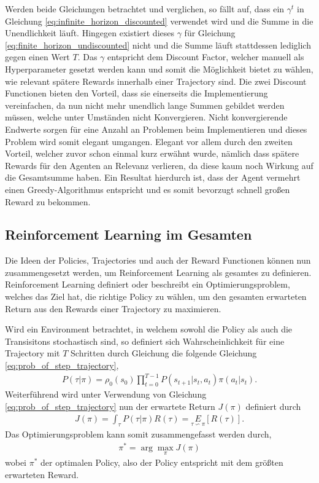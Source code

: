 \documentclass[]{iat}
\begin{document}
Werden beide Gleichungen betrachtet und verglichen, so fällt auf, dass ein $\gamma^t$ in Gleichung \ref{eq:infinite_horizon_discounted} verwendet wird und die Summe in die Unendlichkeit läuft. Hingegen existiert dieses $\gamma$ für Gleichung \ref{eq:finite_horizon_undiscounted} nicht und die Summe läuft stattdessen lediglich gegen einen Wert $T$. Das $\gamma$ entspricht dem Discount Factor, welcher manuell als Hyperparameter gesetzt werden kann und somit die Möglichkeit bietet zu wählen, wie relevant spätere Rewards innerhalb einer Trajectory sind. Die zwei Discount Functionen bieten den Vorteil, dass sie einerseits die Implementierung vereinfachen, da nun nicht mehr unendlich lange Summen gebildet werden müssen, welche unter Umständen nicht Konvergieren. Nicht konvergierende Endwerte sorgen für eine Anzahl an Problemen beim Implementieren und dieses Problem wird somit elegant umgangen. Elegant vor allem durch den zweiten Vorteil, welcher zuvor schon einmal kurz erwähnt wurde, nämlich dass spätere Rewards für den Agenten an Relevanz verlieren, da diese kaum noch Wirkung auf die Gesamtsumme haben. Ein Resultat hierdurch ist, dass der Agent vermehrt einen Greedy-Algorithmus entspricht und es somit bevorzugt schnell großen Reward zu bekommen. \cite[]{SpinningUp2018} \cite[]{Sutton1998}

\subsection{Reinforcement Learning im Gesamten}
Die Ideen der Policies, Trajectories und auch der Reward Functionen können nun zusammengesetzt werden, um Reinforcement Learning als gesamtes zu definieren. Reinforcement Learning definiert oder beschreibt ein Optimierungsproblem, welches das Ziel hat, die richtige Policy zu wählen, um den gesamten erwarteten Return aus den Rewards einer Trajectory zu maximieren.

Wird ein Environment betrachtet, in welchem sowohl die Policy als auch die Transisitons stochastisch sind, so definiert sich Wahrscheinlichkeit für eine Trajectory mit $T$ Schritten durch Gleichung die folgende Gleichung \ref{eq:prob_of_step_trajectory},
\begin{align}
    P(\tau | \pi) = \rho_0(s_0) \prod _{t = 0}^{T-1} P\left(s_{t+1}|s_t,a_t\right)\pi(a_t|s_t). \label{eq:prob_of_step_trajectory}
\end{align}
Weiterführend wird unter Verwendung von Gleichung \ref{eq:prob_of_step_trajectory} nun der erwartete Return $J(\pi)$ definiert durch
\begin{align}
    J(\pi) = \int_{\tau}^{} P(\tau | \pi) R(\tau) = \underset{\tau \backsim \pi}{E}\left[R(\tau)\right]. \label{eq:expected_return}
\end{align}
Das Optimierungsproblem kann somit zusammengefasst werden durch,
\begin{align}
    \pi^* = \arg \underset{\pi}{\max} J(\pi) \label{eq:optimized_problem}
\end{align}
wobei $\pi^*$ der optimalen Policy, also der Policy entspricht mit dem größten erwarteten Reward. \cite[]{SpinningUp2018} \cite[]{Sutton1998}
\end{document}
